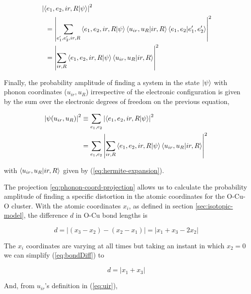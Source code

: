 \begin{equation}
\begin{split}
& \left|\left\langle e_1,e_2,ir,R|\psi\right\rangle\right|^2 \\
& \ \ = \left|\sum_{e_1',e_2',ir,R}\left\langle e_1,e_2,ir,R|\psi\right\rangle\left\langle u_{ir},u_R|ir,R\right\rangle\left\langle e_1,e_2|e_1',e_2'\right\rangle\right|^2 \\
& \ \ = \left|\sum_{ir,R}\left\langle e_1,e_2,ir,R|\psi\right\rangle\left\langle u_{ir},u_R|ir,R\right\rangle\right|^2
\end{split}
\end{equation}

Finally, the probability amplitude of finding a system in the state $\left | \psi \right\rangle$ with phonon coordinates ($u_{ir},u_R$) irrespective of the electronic configuration is given by the sum over the electronic degrees of freedom on the previous equation,

\begin{equation}\label{eq:phonon-coord-projection}
\begin{split} \left|\psi(u_{ir}, u_R)\right|^2 & \equiv \sum_{e_1,e_2}\left|\left\langle e_1,e_2,ir,R|\psi\right\rangle\right|^2 \\
& = \sum_{e_1,e_2} \left|\sum_{ir,R}\left\langle e_1,e_2,ir,R|\psi\right\rangle\left\langle u_{ir},u_R|ir,R\right\rangle\right|^2
\end{split}
\end{equation}

\noindent with $\left\langle u_{ir},u_R|ir,R\right\rangle$ given by (\ref{eq:hermite-expansion}).

The projection \ref{eq:phonon-coord-projection} allows us to calculate the probability amplitude of finding a specific distortion in the atomic coordinates for the O-Cu-O cluster.
With the atomic coordinates $x_i$, as defined in section \ref{sec:isotopic-model}, the difference $d$ in O-Cu bond lengths is

\begin{equation}\label{eq:bondDiff}
d= \left| (x_3 - x_2) - (x_2 - x_1) \right| = \left| x_1 + x_3 - 2x_2 \right|
\end{equation}

The $x_i$ coordinates are varying at all times but taking an instant in which $x_2=0$ we can simplify (\ref{eq:bondDiff}) to

\begin{equation}\label{eq:bondDiffSimpl}
d=\left|x_1+x_3\right|
\end{equation}

And, from $u_{ir}$'s definition in (\ref{eq:uir}),


